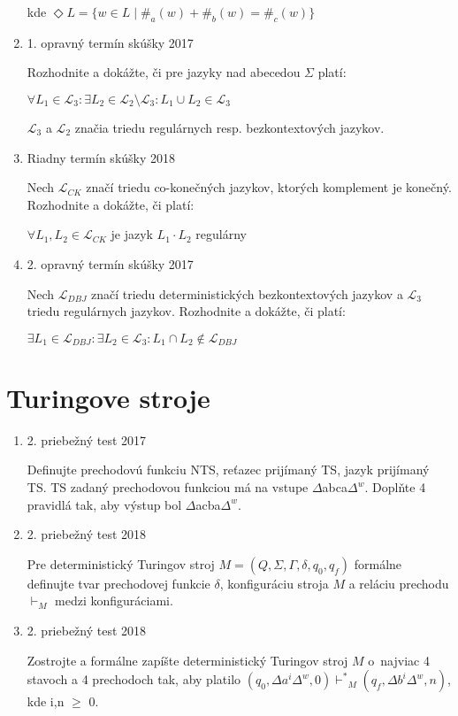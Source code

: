 \documentclass[]{article}
\begin{document}
\begin{enumerate}
		kde $\Diamond L = \{w \in L \mid \#_a(w) + \#_b(w) = \#_c(w)\}$

		\item 1. opravný termín skúšky 2017
	
		Rozhodnite a dokážte, či pre jazyky nad abecedou $\Sigma$ platí:
		
		$\forall L_1 \in \mathcal{L}_3: \exists L_2 \in \mathcal{L}_2 \setminus \mathcal{L}_3: L_1 \cup L_2 \in \mathcal{L}_3$
		
		$\mathcal{L}_3$ a $\mathcal{L}_2$ značia triedu regulárnych resp. bezkontextových jazykov.
	
		\item Riadny termín skúšky 2018
		
		Nech $\mathcal{L}_{CK}$ značí triedu co-konečných jazykov, ktorých komplement je konečný. Rozhodnite a dokážte, či platí:
		
		$\forall L_1, L_2 \in \mathcal{L}_{CK}$ je jazyk $L_1 \cdot L_2$ regulárny
		
		\item 2. opravný termín skúšky 2017
		
		Nech $\mathcal{L}_{DBJ}$ značí triedu deterministických bezkontextových jazykov a $\mathcal{L}_{3}$ triedu regulárnych jazykov. Rozhodnite a dokážte, či platí:
		
		$\exists L_1 \in \mathcal{L}_{DBJ}: \exists L_2 \in \mathcal{L}_{3}: L_1 \cap L_2 \notin \mathcal{L}_{DBJ}$
	\end{enumerate}

	\section{Turingove stroje}
	
	\begin{enumerate}
		\item 2. priebežný test 2017
		
		Definujte prechodovú funkciu NTS, reťazec prijímaný TS, jazyk prijímaný TS. TS zadaný prechodovou funkciou má na vstupe $\Delta$abca$\Delta^{w}$. Doplňte 4 pravidlá tak, aby výstup bol $\Delta$acba$\Delta^w$.
		
		\item 2. priebežný test 2018
		
		Pre deterministický Turingov stroj $M = (Q, \Sigma, \Gamma, \delta, q_0, q_f)$ formálne definujte tvar prechodovej funkcie $\delta$, konfiguráciu stroja $M$ a reláciu prechodu $\vdash_M$ medzi konfiguráciami.
		
		\item 2. priebežný test 2018
		
		Zostrojte a formálne zapíšte deterministický Turingov stroj $M$ o~najviac 4 stavoch a 4 prechodoch tak, aby platilo $(q_0, \Delta a^i\Delta^w, 0) {\vdash^*}_M (q_f, \Delta b^i\Delta^w, n)$, kde i,n $\geq$ 0.
	\end{enumerate}
\end{document}
